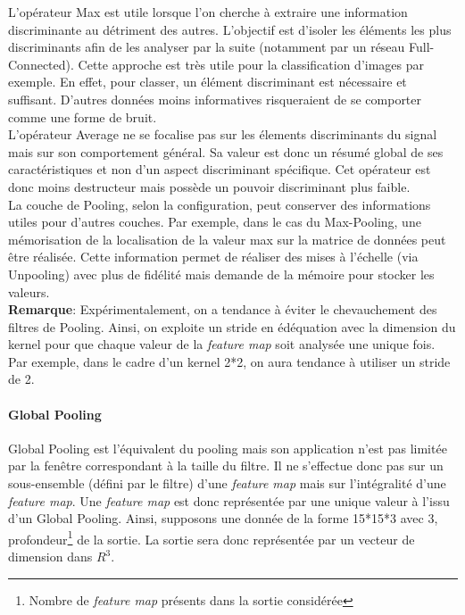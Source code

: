 \noindent L'opérateur Max est utile lorsque l'on cherche à extraire une information discriminante au détriment des autres. L'objectif est d'isoler les éléments les plus discriminants afin de les analyser par la suite (notamment par un réseau Full-Connected). Cette approche est très utile pour la classification d'images par exemple. En effet, pour classer, un élément discriminant est nécessaire et suffisant. D'autres données moins informatives risqueraient de se comporter comme une forme de bruit.\\

\noindent L'opérateur Average ne se focalise pas sur les élements discriminants du signal mais sur son comportement général. Sa valeur est donc un résumé global de ses caractéristiques et non d'un aspect discriminant spécifique. Cet opérateur est donc moins destructeur mais possède un pouvoir discriminant plus faible.\\

\noindent La couche de Pooling, selon la configuration, peut conserver des informations utiles pour d'autres couches. Par exemple, dans le cas du Max-Pooling, une mémorisation de la localisation de la valeur max sur la matrice de données peut être réalisée. Cette information permet de réaliser des mises à l'échelle (via Unpooling) avec plus de fidélité mais demande de la mémoire pour stocker les valeurs.\\

\noindent \textbf{Remarque}: Expérimentalement, on a tendance à éviter le chevauchement des filtres de Pooling. Ainsi, on exploite un stride en édéquation avec la dimension du kernel pour que chaque valeur de la \textit{feature map} soit analysée une unique fois. Par exemple, dans le cadre d'un kernel 2*2, on aura tendance à utiliser un stride de 2.

\paragraph{Global Pooling}

\noindent Global Pooling est l'équivalent du pooling mais son application n'est pas limitée par la fenêtre correspondant à la taille du filtre. Il ne s'effectue donc pas sur un sous-ensemble (défini par le filtre) d'une \textit{feature map} mais sur l'intégralité d'une \textit{feature map}. Une \textit{feature map} est donc représentée par une unique valeur à l'issu d'un Global Pooling.  Ainsi, supposons une donnée de la forme 15*15*3 avec 3, profondeur\footnote{Nombre de \textit{feature map} présents dans la sortie considérée} de la sortie. La sortie sera donc représentée par un vecteur de dimension dans $R^3$.\\


